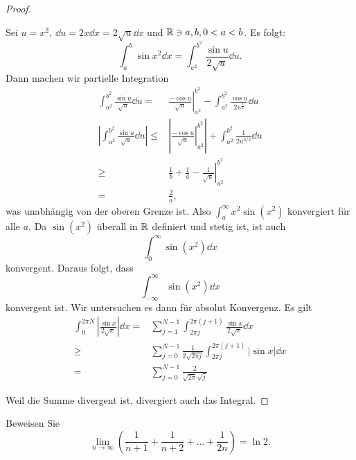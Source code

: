\begin{proof}
\begin{parts}
		Sei $u=x^2,~\dd{u}=2x\dd{x}=2\sqrt{u} \dd{x}$ und $\mathbb{R}\ni a,b, 0<a<b$. Es folgt:
		\[
			\int_a^b \sin x^2\dd{x}=\int_{a^2}^{b^2} \frac{\sin u}{2\sqrt{u} }\dd{u} 
		.\] 
		Dann machen wir partielle Integration
		\begin{align*}
			\int_{a^2}^{b^2}\frac{\sin u}{\sqrt{u} }\dd{u}=&\left.\frac{-\cos u}{\sqrt{u} }\right|_{a^2}^{b^2}-\int_{a^2}^{b^2}\frac{\cos u}{2u^{\frac{3}{2}}}\dd{u}\\
				\left| \int_{a^2}^{b^2}\frac{\sin u}{\sqrt{u} }\dd{u} \right|\le&\left| \left.\frac{-\cos u}{\sqrt{u} }\right|_{a^2}^{b^2} \right|+\int_{a^2}^{b^2} \frac{1}{2u^{3 / 2}}\dd{u}\\
					\ge& \frac{1}{b}+\frac{1}{a}-\left. \frac{1}{\sqrt{u} }\right|_{a^2}^{b^2}\\
						=& \frac{2}{a},
		\end{align*}
		was unabhängig von der oberen Grenze ist. Also $\int_a^\infty x^2 \sin(x^2)	$ konvergiert f\"{u}r alle $a$. Da $\sin(x^2)$ überall in $\mathbb{R}$ definiert und stetig ist, ist auch
		\[
			\int_0^\infty \sin(x^2)\dd{x}
		\]
		konvergent. Daraus folgt, dass
		\[
			\int_{-\infty}^\infty\sin(x^2)\dd{x}
		\]
		konvergent ist. Wir untersuchen es dann f\"{u}r absolut Konvergenz. Es gilt
		\begin{align*}
			\int_0^{2\pi N}\left| \frac{\sin x}{2\sqrt{x} } \right| \dd{x}=&\sum_{j=1}^{N-1}\int_{2\pi j}^{2\pi (j+1)}\frac{\sin x}{2\sqrt{x} }\dd{x}\\
			\ge&\sum_{j=0}^{N-1}\frac{1}{2\sqrt{2\pi j} }\int_{2\pi j}^{2\pi (j+1)}|\sin x|\dd{x}\\
			=&\sum_{j=0}^{N-1}\frac{2}{\sqrt{2\pi} \sqrt{j} }
		\end{align*}
	\end{parts}
	Weil die Summe divergent ist, divergiert auch das Integral.
\end{proof}
\begin{Problem}
	Beweisen Sie
	\[
	\lim_{n \to \infty} \left( \frac{1}{n+1}+\frac{1}{n+2}+\dots+\frac{1}{2n} \right)=\ln 2 
	.\] 
\end{Problem}

